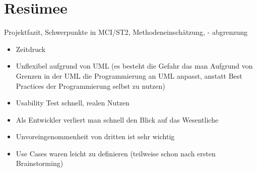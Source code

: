\chapter{Resümee}
Projektfazit, Schwerpunkte in MCI/ST2, Methodeneinschätzung, -
abgrenzung

\begin{itemize}
\item Zeitdruck
\item Unflexibel aufgrund von UML (es besteht die Gefahr das man Aufgrund von Grenzen in der UML die Programmierung an UML anpasst, anstatt Best Practices der Programmierung selbst zu nutzen)
\item Usability Test schnell, realen Nutzen
\item Als Entwickler verliert man schnell den Blick auf das Wesentliche
\item Unvoreingenommenheit von dritten ist sehr wichtig
\item Use Cases waren leicht zu definieren (teilweise schon nach ersten Brainstorming)
\end{itemize}